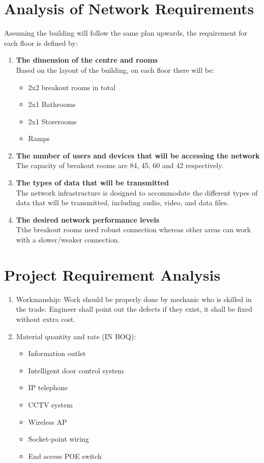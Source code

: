 \documentclass[12pt]{article}
\begin{document}
\section{Analysis of Network Requirements}
Assuming the building will follow the same plan upwards, the requirement for each floor is defined by:
\begin{enumerate}
\item {\bfseries The dimension of the centre and rooms \\}
Based on the layout of the building, on each floor there will be:
\begin{itemize}
    \item 2x2 breakout rooms in total
    \item 2x1 Bathrooms  
    \item 2x1 Storerooms 
    \item Ramps
\end{itemize}

\item {\bfseries The number of users and devices that will be accessing the network\\}
The capacity of breakout rooms are 84, 45, 60 and 42 respectively.

\item {\bfseries The types of data that will be transmitted\\}
The network infrastructure is designed to accommodate the different types of data that will be transmitted, including audio, video, and data files.

\item {\bfseries The desired network performance levels\\}
Tthe breakout rooms need robust connection whereas other areas can work with a slower/weaker connection.
\end{enumerate}

\section{Project Requirement Analysis}
\begin{enumerate}
    \item Workmanship: Work should be properly done by mechanic who is skilled in the trade. Engineer shall point out the defects if they exist, it shall be fixed without extra cost.
    \item Material quantity and rate (IN BOQ):
    \begin{itemize}
        \item  Information outlet 
        \item Intelligent door control system 
        \item IP telephone 
        \item CCTV system 
        \item Wireless AP 
        \item Socket-point wiring 
        \item End access POE switch
    \end{itemize}
   
\end{enumerate}
\end{document}
